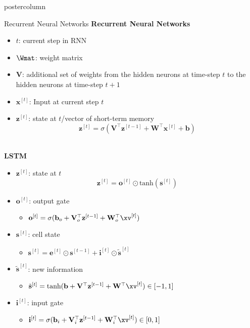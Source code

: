 \documentclass{beamer}
\begin{document}
\begin{frame}[fragile]{}
\begin{columns}
\begin{column}{.31\textwidth}
\begin{beamercolorbox}[center]{postercolumn}
\begin{minipage}{.98\textwidth}
{\begin{myblock}{Recurrent Neural Networks}
\textbf{Recurrent Neural Networks}
\begin{itemize}
\item[] $t$: current step in RNN
\item[] $\Wmat$: weight matrix 
\item[] $\mathbf{V}$: additional set of weights from the hidden neurons at time-step $t$ to the hidden neurons at time-step $t+1$
\item[] $\mathbf{x}^{[t]}$: Input at current step $t$
\item[] $\mathbf{z}^{[t]}$: state at $t$/vector of short-term memory 
$$\mathbf{z}^{[t]} = \sigma(\mathbf{V}^\top\mathbf{z}^{[t-1]} + \mathbf{W}^\top \mathbf{x}^{[t]} + \mathbf{b})$$
\end{itemize}
\ \\
\textbf{LSTM}
\begin{itemize}
\item[] $\mathbf{z}^{[t]}$: state at $t$
$$\mathbf{z}^{[t]} = \mathbf{o}^{[t]} \odot \text{tanh}(\mathbf{s}^{[t]})$$
\item[] $\mathbf{o}^{[t]}$: output gate
\begin{itemize} \normalsize
\item[]$\mathbf{o}^{[t]} = \sigma(\mathbf{b}_o + \mathbf{V}_o^\top \mathbf{z}^{[t-1]} + \mathbf{W}_o^\top \xv^{[t]})$
\end{itemize}
\item[] $\mathbf{s}^{[t]}$: cell state 
\begin{itemize} \normalsize
\item[]$\mathbf{s}^{[t]} = \mathbf{e}^{[t]} \odot \mathbf{s}^{[t-1]} + \mathbf{i}^{[t]} \odot \tilde{\mathbf{s}}^{[t]}$
\end{itemize}
\item[] $\tilde{\mathbf{s}}^{[t]}$: new information 
\begin{itemize} \normalsize
\item[]$\tilde{\mathbf{s}}^{[t]} = \text{tanh}(\mathbf{b} + \mathbf{V}^\top \mathbf{z}^{[t-1]} + \mathbf{W}^\top \xv^{[t]}) \in [-1, 1]$
\end{itemize}
\item[] $\mathbf{i}^{[t]}$: input gate 
\begin{itemize} \normalsize
\item[]$\mathbf{i}^{[t]} = \sigma(\mathbf{b}_i + \mathbf{V}_i^\top \mathbf{z}^{[t-1]} + \mathbf{W}_i^\top \xv^{[t]}) \in [0,1]$
\end{itemize}

\end{itemize}
\end{myblock}}
\end{minipage}
\end{beamercolorbox}
\end{column}
\end{columns}
\end{frame}
\end{document}
